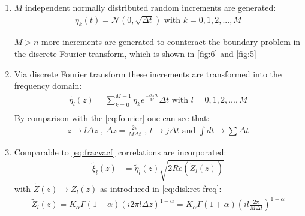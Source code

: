\documentclass[
  a4paper,BCOR10mm,oneside,
  bibtotoc,idxtotoc,
  headsepline,footsepline,%
  fleqn,openbib
]{scrbook}
\begin{document}
\begin{enumerate}
 \item $M$ independent normally distributed random increments are generated: 
\begin{align}
 \eta_k(t)= \mathcal{N}(0,\sqrt{\Delta t}) \text{  with  } k=0,1,2,...,M 
\end{align}

$M>n$  more increments are generated to counteract the boundary problem in the discrete Fourier transform, which is shown in \cref{fig:6} and \cref{fig:5}

\item Via discrete Fourier transform these increments are transformed into the frequency domain:
\begin{align}
 \tilde{\eta_l}(z)=\sum_{k=0}^{M-1} \eta_k e^{\frac{- i 2 \pi  l k }{M}} \Delta t   \text{  with  }  l=0,1,2,...,M  \label{eq:fouriertrans}\\ 
\end{align}
By comparison with the \cref{eq:fourier} one can see that:
\begin{align}
 z \rightarrow  l \Delta z \text{ , } \Delta z =   \frac{2 \pi }{M \Delta t} \text{ , } t \rightarrow j \Delta t \text{ and } \int dt \rightarrow \sum \Delta t \label{eq:diskret-freq} 
\end{align}
 
\item Comparable to \cref{eq:fracvacf} correlations are incorporated: 
 \begin{align}
   \tilde{\xi}_{l}(z)&= \tilde{\eta}_l(z) \sqrt{2 Re( \tilde{Z}_l(z))} \label{eq:problem} 
  \end{align}
 with $\tilde{Z}(z)\rightarrow \tilde{Z}_l(z)$ as introduced in \cref{eq:diskret-freq}:
  \begin{align}
   \tilde{Z}_l(z) = K_{\alpha} \Gamma(1+\alpha)(i 2 \pi l \Delta z)^{1-\alpha} =  K_{\alpha} \Gamma(1+\alpha)(i l \frac{ 2 \pi}{M \Delta t})^{1-\alpha} 
 \end{align}
 

\end{enumerate}
\end{document}
